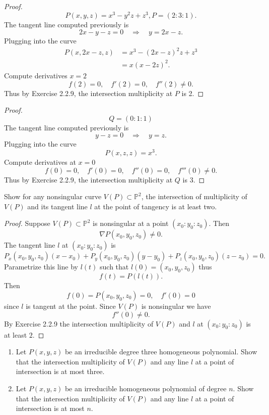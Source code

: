 \begin{proof}
    \[P(x,y,z) = x^3 - y^2 z + z^3,  P=(2:3:1).\] 
    The tangent line computed previously is
    \[
    2x - y - z = 0 \quad \Longrightarrow \quad y = 2x - z.
    \]
    Plugging into the curve
    \[
    \begin{aligned}
    P(x,2x-z,z) &= x^3 - (2x - z)^2 z + z^3 \\
    &= x(x-2z)^2.
    \end{aligned}
    \]
    Compute derivatives $x=2$ 
    \[
    f(2) = 0, \quad f'(2) = 0, \quad f''(2) \neq 0.
    \]
    Thus by Exercise 2.2.9, the intersection multiplicity at $P$ is 2.
\end{proof}

\begin{proof}
    \[Q=(0:1:1)\]
    The tangent line computed previously is
    \[
    y - z = 0 \quad \Longrightarrow \quad y = z.
    \]
    Plugging into the curve
    \[
    P(x,z,z) = x^3.
    \]
    Compute derivatives at $x=0$
    \[
    f(0) = 0, \quad f'(0) = 0, \quad f''(0) = 0, \quad f'''(0) \neq 0.
    \]
    Thus by Exercise 2.2.9, the intersection multiplicity at $Q$ is 3.
\end{proof}

\begin{tcolorbox}[title=Problem 18, breakable]
    Show for any nonsingular curve $V(P) \subset \mathbb{P}^2$,
    the intersection of multiplicity of $V(P)$ and its tangent line $l$
    at the point of tangency is at least two.
\end{tcolorbox}

\begin{proof}
    Suppose $V(P) \subset \mathbb{P}^2$ is nonsingular at a point $(x_0:y_0:z_0)$.  
    Then 
    \[
    \nabla P(x_0,y_0,z_0) \neq 0.
    \]
    The tangent line $l$ at $(x_0:y_0:z_0)$ is
    \[
    P_x(x_0,y_0,z_0) (x - x_0) + P_y(x_0,y_0,z_0) (y - y_0) + P_z(x_0,y_0,z_0) (z - z_0) = 0.
    \]
    Parametrize this line by $l(t)$ such that $l(0) = (x_0,y_0,z_0)$ thus
    \[
    f(t) = P(l(t)).
    \]
    Then
    \[
    f(0) = P(x_0,y_0,z_0) = 0, \quad f'(0) = 0
    \]
    since $l$ is tangent at the point.  
    Since $V(P)$ is nonsingular we have
    \[
    f''(0) \neq 0.
    \]
    By Exercise 2.2.9 the intersection multiplicity of $V(P)$ and $l$ at $(x_0:y_0:z_0)$ is at least $2$.
\end{proof}

\begin{tcolorbox}[title=Problem 19, breakable]
    \begin{enumerate}
        \item Let $P(x, y, z)$ be an irreducible degree three homogeneous polynomial.
        Show that the intersection multiplicity of $V(P)$ and any line $l$ at a point 
        of intersection is at most three.
        \item Let $P(x, y, z)$ be an irreducible homogeneous polynomial of degree $n$.
        Show that the intersection multiplicity of $V(P)$ and any line $l$ at a point of intersection 
        is at most $n$.
    \end{enumerate}
\end{tcolorbox}

